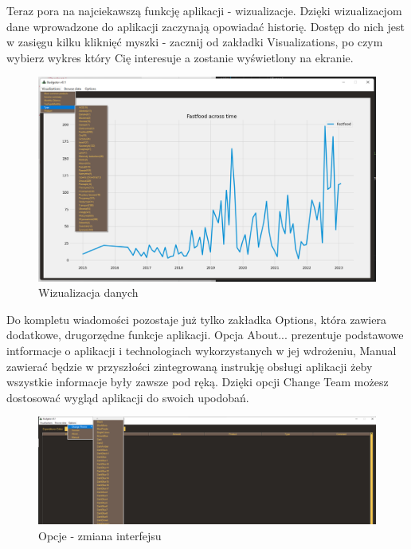 \documentclass[a4paper,10pt, twoside]{report}
\begin{document}
{Teraz pora na najciekawszą funkcję aplikacji - wizualizacje. Dzięki 
wizualizacjom dane wprowadzone do aplikacji zaczynają opowiadać historię. 
Dostęp do nich jest w zasięgu kilku kliknięć myszki - zacznij od zakładki 
Visualizations, po czym wybierz wykres który Cię interesuje a zostanie 
wyświetlony na ekranie.}

\begin{figure}[H]           %
    \caption{Wizualizacja danych}
    \label{fig:Wizualizacja danych}
    \centering
    \includegraphics[width=12cm]{figures/Interface_Visualizations_v0.3.png}
\end{figure}

{Do kompletu wiadomości pozostaje już tylko zakładka Options, która zawiera 
dodatkowe, drugorzędne funkcje aplikacji. Opcja About... prezentuje podstawowe 
intformacje o aplikacji i technologiach wykorzystanych w jej wdrożeniu, Manual 
zawierać będzie w przyszłości zintegrowaną instrukję obsługi aplikacji żeby 
wszystkie informacje były zawsze pod ręką. Dzięki opcji Change Team możesz 
dostosować wygląd aplikacji do swoich upodobań.}

\begin{figure}[H]           %
    \caption{Opcje - zmiana interfejsu}
    \label{fig:Opcje - zmiana interfejsu}
    \centering
    \includegraphics[width=12cm]{figures/Guide/Righten_Instruction_06_Options_Change-theme.png}
\end{figure}
\end{document}
